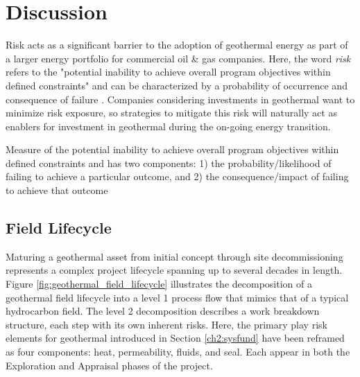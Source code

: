 \chapter{Discussion}\label{ch7:discuss}
\label{ch7:discussion}

Risk acts as a significant barrier to the adoption of geothermal energy as part of a larger energy portfolio for commercial oil \& gas companies. Here, the word \textit{risk} refers to the "potential inability to achieve overall program objectives within defined constraints" and can be characterized by a probability of occurrence and consequence of failure \citep{malone_development_2004}.  Companies considering investments in geothermal want to minimize risk exposure, so strategies to mitigate this risk will naturally act as enablers for investment in geothermal during the on-going energy transition.

Measure of the potential inability to achieve overall program objectives within
defined constraints and has two components: 1) the probability/likelihood of failing
to achieve a particular outcome, and 2) the consequence/impact of failing to achieve
that outcome

\section{Field Lifecycle}
\label{ch7:field_lifecycle}

Maturing a geothermal asset from initial concept through site decommissioning represents a complex project lifecycle spanning up to several decades in length. Figure \ref{fig:geothermal_field_lifecycle} illustrates the decomposition of a geothermal field lifecycle into a level 1 process flow that mimics that of a typical hydrocarbon field. The level 2 decomposition describes a work breakdown structure, each step with its own inherent risks. Here, the primary play risk elements for geothermal introduced in Section \ref{ch2:sysfund} have been reframed as four components: heat, permeability, fluids, and seal. Each appear in both the Exploration and Appraisal phases of the project. 


